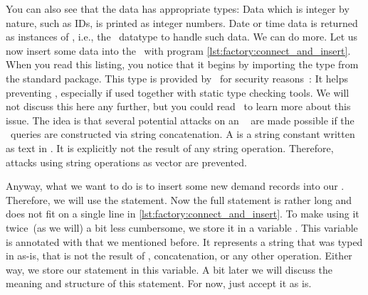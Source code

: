 You can also see that the data has appropriate types:
Data which is integer by nature, such as IDs, is printed as integer numbers.
Date or time data is returned as instances of , i.e., the \python\ datatype to handle such data.%
\FloatBarrier%
\endhsection%
%
%
%
%
%
%
%
%
%
We can do more.
Let us now insert some data into the \db\ with program \cref{lst:factory:connect_and_insert}.
When you read this listing, you notice that it begins by importing the type  from the standard  package.
This type is provided by \python\ for security reasons~\cite{PEP675}:
It helps preventing , especially if used together with static type checking tools.
We will not discuss this here any further, but you could read~\cite{PEP675,VDGE2022PPDAFP:ST} to learn more about this issue.
The idea is that several potential attacks on an \sql\  are made possible if the \sql\ queries are constructed via string concatenation.
A  is a string constant written as text in \python.
It is explicitly not the result of any string operation.
Therefore, attacks using string operations as vector are prevented.

Anyway, what we want to do is to insert some new demand records into our \db.
Therefore, we will use the  statement.
Now the full  statement is rather long and does not fit on a single line in \cref{lst:factory:connect_and_insert}.
To make using it twice~(as we will) a bit less cumbersome, we store it in a variable .
This variable is annotated with   that we mentioned before.
It represents a string that was typed in as-is, that is not the result of , concatenation, or any other operation.
Either way, we store our statement in this variable.
A bit later we will discuss the meaning and structure of this statement.
For now, just accept it as is.

